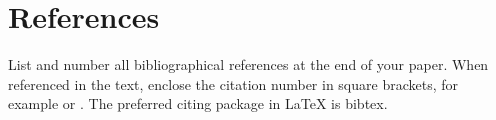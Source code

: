 \documentclass{jcst}
\begin{document}
\section{References}
List and number all bibliographical references at the end of your paper.
When referenced in the text, enclose the citation  number in square brackets,
for example \cite{book} or \cite{article,unpublished,proceedings, phdthesis}. The preferred citing package in LaTeX is bibtex.



\end{document}
